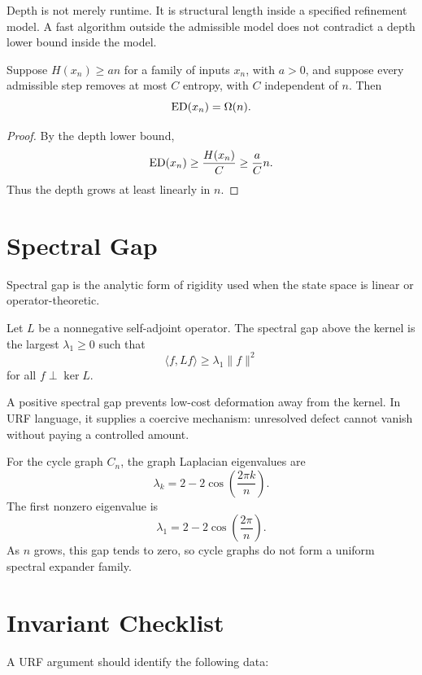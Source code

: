 Depth is not merely runtime. It is structural length inside a specified
refinement model. A fast algorithm outside the admissible model does not
contradict a depth lower bound inside the model.

\begin{theorem}
Suppose \(H(x_n)\ge an\) for a family of inputs \(x_n\), with \(a>0\), and
suppose every admissible step removes at most \(C\) entropy, with \(C\)
independent of \(n\). Then
\[
\mathrm{ED}(x_n)=\Omega(n).
\]
\end{theorem}

\begin{proof}
By the depth lower bound,
\[
\mathrm{ED}(x_n)\ge \frac{H(x_n)}{C}\ge \frac{a}{C}n.
\]
Thus the depth grows at least linearly in \(n\).
\end{proof}

\section{Spectral Gap}

Spectral gap is the analytic form of rigidity used when the state space is
linear or operator-theoretic.

\begin{definition}
Let \(L\) be a nonnegative self-adjoint operator. The spectral gap above the
kernel is the largest \(\lambda_1\ge 0\) such that
\[
\langle f,Lf\rangle\ge \lambda_1\|f\|^2
\]
for all \(f\perp\ker L\).
\end{definition}

A positive spectral gap prevents low-cost deformation away from the kernel.
In URF language, it supplies a coercive mechanism: unresolved defect cannot
vanish without paying a controlled amount.

\begin{example}
For the cycle graph \(C_n\), the graph Laplacian eigenvalues are
\[
\lambda_k=2-2\cos\left(\frac{2\pi k}{n}\right).
\]
The first nonzero eigenvalue is
\[
\lambda_1=2-2\cos\left(\frac{2\pi}{n}\right).
\]
As \(n\) grows, this gap tends to zero, so cycle graphs do not form a uniform
spectral expander family.
\end{example}

\section{Invariant Checklist}

A URF argument should identify the following data:

